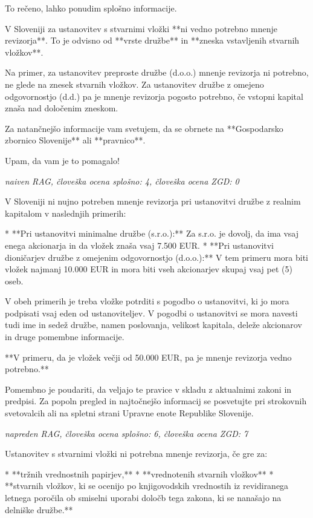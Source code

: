 \documentclass[a4paper,12pt,openright]{book}
\begin{document}
To rečeno, lahko ponudim splošno informacije.

V Sloveniji za ustanovitev s stvarnimi vložki **ni vedno potrebno mnenje revizorja**. To je odvisno od **vrste družbe** in **zneska vstavljenih stvarnih vložkov**.

Na primer, za ustanovitev preproste družbe (d.o.o.)  mnenje revizorja ni potrebno, ne glede na znesek stvarnih vložkov. Za ustanovitev družbe z omejeno odgovornostjo (d.d.) pa je mnenje revizorja pogosto potrebno, če vstopni kapital znaša nad določenim zneskom.

Za natančnejšo informacije vam svetujem, da se obrnete na **Gospodarsko zbornico Slovenije** ali **pravnico**.


Upam, da vam je to pomagalo!

\vspace{0.5cm}
\textit{naiven RAG, človeška ocena splošno: 4, človeška ocena ZGD: 0}

V Sloveniji ni nujno potreben mnenje revizorja pri ustanovitvi družbe z realnim kapitalom v naslednjih primerih:

* **Pri ustanovitvi minimalne družbe (s.r.o.):** Za s.r.o. je dovolj, da ima vsaj enega akcionarja in da vložek znaša vsaj 7.500 EUR.
* **Pri ustanovitvi dioničarjev družbe z omejenim odgovornostjo (d.o.o.):** V tem primeru mora biti vložek najmanj 10.000 EUR in mora biti vseh akcionarjev skupaj vsaj pet (5) oseb.

V obeh primerih je treba vložke potrditi s pogodbo o ustanovitvi, ki jo mora podpisati vsaj eden od ustanoviteljev. V pogodbi o ustanovitvi se mora navesti tudi ime in sedež družbe, namen poslovanja, velikost kapitala, deleže akcionarov in druge pomembne informacije.

**V primeru, da je vložek večji od 50.000 EUR, pa je mnenje revizorja vedno potrebno.**


Pomembno je poudariti, da veljajo te pravice v skladu z aktualnimi zakoni in predpisi. Za popoln pregled in najtočnejšo informacij se posvetujte pri strokovnih svetovalcih ali na spletni strani Upravne enote Republike Slovenije.

\vspace{0.5cm}
\textit{napreden RAG, človeška ocena splošno: 6, človeška ocena ZGD: 7}

Ustanovitev s stvarnimi vložki ni potrebna mnenje revizorja, če gre za:

* **tržnih vrednostnih papirjev,**
* **vrednotenih stvarnih vložkov** 
* **stvarnih vložkov, ki se ocenijo po knjigovodskih vrednostih iz revidiranega letnega poročila ob smiselni uporabi določb tega zakona, ki se nanašajo na delniške družbe.**
\end{document}
